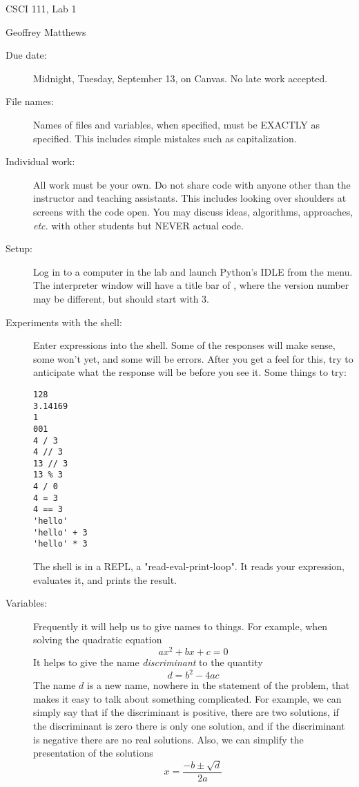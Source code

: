 \documentclass[12pt]{article}
\begin{document}
\sloppy
\centerline{\Large CSCI 111, Lab 1}
\centerline{\large Geoffrey Matthews}

\begin{description}
\item[Due date:] Midnight, Tuesday, September 13, on Canvas.
No late work accepted.  

\item[File names:]  Names of files and variables, when specified,
must be EXACTLY as specified.  This includes simple mistakes such
as capitalization.

\item[Individual work:]  All work must be your own.  Do not share
code with anyone other than the instructor and teaching assistants.
This includes looking over shoulders at screens with the code open.
You may discuss ideas, algorithms, approaches, {\em etc.} with
other students but NEVER actual code.

\item[Setup:] Log in to a computer in the lab and launch
Python's IDLE from the menu.  The interpreter window will have
a title bar of , where the version
number may be different, but should start with 3.

\item[Experiments with the shell:]
Enter expressions into the shell.  Some of the 
responses will make sense, some won't yet, and some
will be errors.  After you get
a feel for this, try to anticipate what the response
will be before you see it.  Some things to try:
\begin{Verbatim}[frame=single]
128
3.14169
1
001
4 / 3
4 // 3
13 // 3
13 % 3
4 / 0
4 = 3
4 == 3
'hello'
'hello' + 3
'hello' * 3
\end{Verbatim}
The shell is in a REPL, a "read-eval-print-loop".
It reads your expression, evaluates it, and prints the
result.  

\item[Variables:] Frequently it will help
us to give names to things.  For example,
when solving the quadratic equation
\[
ax^2 + bx + c = 0
\]
It helps to give the name {\em discriminant}
to the quantity
\[
d = b^2 - 4ac
\]
The name $d$ is a new name, nowhere in the statement
of the problem, that makes it easy to talk about
something complicated.  For example,
we can simply say that if the discriminant
is positive, there are two solutions, if the
discriminant is zero there
is only one solution, and if the discriminant is
negative there are no
real solutions.  Also, we can simplify the presentation
of the solutions
\[
x = \frac{-b \pm \sqrt{d}}{2a}
\]


\end{description}
\end{document}
